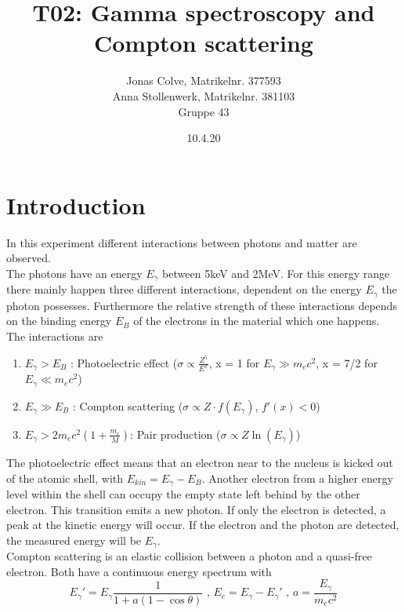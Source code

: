 \documentclass{article}
\title{\huge T02: Gamma spectroscopy and Compton scattering}
\author{\Large Jonas Colve, Matrikelnr. 377593\\ \Large Anna Stollenwerk, Matrikelnr. 381103 \\Gruppe 43}
\date{10.4.20}
\begin{document}
\renewcommand{\figurename}{Fig.}
\renewcommand{\tablename}{Tab.}

\maketitle
\newpage



\tableofcontents

\newpage

\section{Introduction}
In this experiment different interactions between photons and matter are observed.\\
The photons have an energy $E_\gamma$ between 5keV and 2MeV. For this energy range there mainly happen three different interactions, dependent on the energy $E_\gamma$ the photon possesses.
Furthermore the relative strength of these interactions depends on the binding energy $E_B$ of the electrons in the material which one happens. The interactions are
\begin{enumerate}
    \item $E_\gamma > E_B$ : Photoelectric effect ($\sigma \propto \frac{Z^5}{E^x}$, x = 1 for $E_\gamma \gg m_ec^2$, x = 7/2 for $E_\gamma \ll m_ec^2$)
    \item $E_\gamma \gg E_B$ : Compton scattering ($\sigma \propto Z\cdot f(E_\gamma)$, $f'(x)<0$)
    \item $E_\gamma > 2m_e c^2(1+ \frac{m_e}{M})$: Pair production ($\sigma \propto Z\ln(E_\gamma)$)
\end{enumerate}
The photoelectric effect means that an electron near to the nucleus is kicked out of the atomic shell, with $E_{kin} = E_\gamma - E_B$.
Another electron from a higher energy level within the shell can occupy the empty state left behind by the other electron. This transition emits a new photon.
If only the electron is detected, a peak at the kinetic energy will occur. 
If the electron and the photon are detected, the measured energy will be $E_\gamma$.\\
Compton scattering is an elastic collision between a photon and a quasi-free electron. Both have a continuous energy spectrum with
\begin{equation}
    E_\gamma' = E_\gamma \frac{1}{1+a(1-\cos{\theta})} \mbox{ , } E_e = E_\gamma - E_\gamma' \mbox{ , } a = \frac{E_\gamma}{m_ec^2}
    \label{eq_Compton}
\end{equation}
\end{document}
